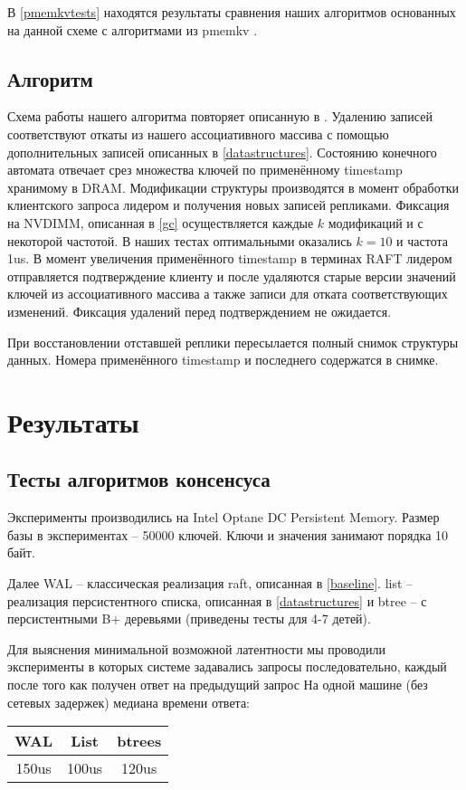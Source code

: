 \documentclass[pdftex,ptm,12pt,a4paper]{report}
\theoremstyle{definition}
\begin{document}
В \ref{pmemkvtests} находятся результаты сравнения наших алгоритмов основанных на данной схеме с алгоритмами из pmemkv \cite{pmemkv}.

\section{Алгоритм}
Схема работы нашего алгоритма повторяет описанную в \cite{raftpaper}. Удалению записей соответствуют откаты из нашего ассоциативного массива с помощью дополнительных записей описанных в \ref{datastructures}. Состоянию конечного автомата отвечает срез множества ключей по применённому timestamp хранимому в DRAM. Модификации структуры производятся в момент обработки
клиентского запроса лидером и получения новых записей репликами. Фиксация на NVDIMM, описанная в \ref{gc} осуществляется каждые $k$ модификаций и с некоторой частотой.
В наших тестах оптимальными оказались $k=10$ и частота 1us. В момент увеличения применённого timestamp в терминах RAFT лидером отправляется подтверждение клиенту и после удаляются
старые версии значений ключей из ассоциативного массива а также записи для отката соответствующих изменений. Фиксация удалений перед подтверждением не ожидается.

При восстановлении отставшей реплики пересылается полный снимок структуры данных. Номера применённого timestamp и последнего содержатся в снимке.

\chapter{Результаты}
\section{Тесты алгоритмов консенсуса}
Эксперименты производились на Intel Optane DC Persistent Memory.
Размер базы в экспериментах -- 50000 ключей. Ключи и значения занимают порядка 10 байт.

Далее  WAL -- классическая реализация raft, описанная в \ref{baseline}. list -- реализация персистентного списка, описанная в \ref{datastructures}
и btree -- с персистентными B+ деревьями (приведены тесты для 4-7 детей).

Для выяснения минимальной возможной латентности мы проводили эксперименты в которых системе задавались запросы последовательно, каждый после того как получен ответ на предыдущий запрос
На одной машине (без сетевых задержек) медиана времени ответа:
\begin{center}
\begin{tabular} {|c c c|}
\hline
    WAL & List & btrees \\
    \hline
150us & 100us & 120us \\
\hline
\end{tabular}
\end{center}
\end{document}

